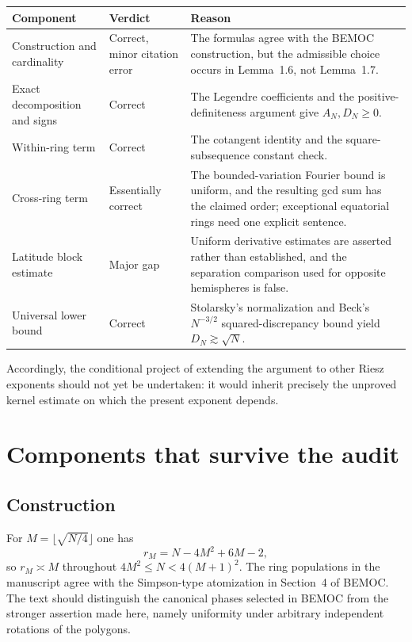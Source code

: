 \documentclass[11pt]{article}
\begin{document}
\begin{center}
\begin{tabular}{p{}p{}p{}}
\toprule
Component & Verdict & Reason\\
\midrule
Construction and cardinality & Correct, minor citation error & The formulas
agree with the BEMOC construction, but the admissible choice occurs in
Lemma~1.6, not Lemma~1.7.\\
Exact decomposition and signs & Correct & The Legendre coefficients and the
positive-definiteness argument give $A_N,D_N\ge0$.\\
Within-ring term & Correct & The cotangent identity and the square-subsequence
constant check.\\
Cross-ring term & Essentially correct & The bounded-variation Fourier bound
is uniform, and the resulting gcd sum has the claimed order; exceptional
equatorial rings need one explicit sentence.\\
Latitude block estimate & Major gap & Uniform derivative estimates are
asserted rather than established, and the separation comparison used for
opposite hemispheres is false.\\
Universal lower bound & Correct & Stolarsky's normalization and Beck's
$N^{-3/2}$ squared-discrepancy bound yield $D_N\gtrsim\sqrt N$.\\
\bottomrule
\end{tabular}
\end{center}

Accordingly, the conditional project of extending the argument to other
Riesz exponents should not yet be undertaken: it would inherit precisely the
unproved kernel estimate on which the present exponent depends.

\section{Components that survive the audit}

\subsection{Construction}

For $M=\lfloor\sqrt{N/4}\rfloor$ one has
\[
 r_M=N-4M^2+6M-2,
\]
so $r_M\asymp M$ throughout $4M^2\le N<4(M+1)^2$.  The ring populations in
the manuscript agree with the Simpson-type atomization in Section~4 of
BEMOC.  The text should distinguish the canonical phases selected in BEMOC
from the stronger assertion made here, namely uniformity under arbitrary
independent rotations of the polygons.
\end{document}
